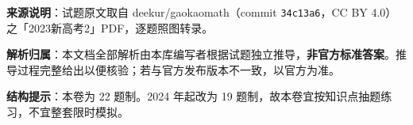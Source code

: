 

\begin{gknotice}
\textbf{来源说明}：试题原文取自 deekur/gaokaomath（commit \texttt{34c13a6}，CC BY 4.0）之「2023新高考2」PDF，逐题照图转录。

\textbf{解析归属}：本文档全部解析由本库编写者根据试题独立推导，\textbf{非官方标准答案}。推导过程完整给出以便核验；若与官方发布版本不一致，以官方为准。

\textbf{结构提示}：本卷为 22 题制。2024 年起改为 19 题制，故本卷宜按知识点抽题练习，不宜整套限时模拟。
\end{gknotice}

\par\medskip


